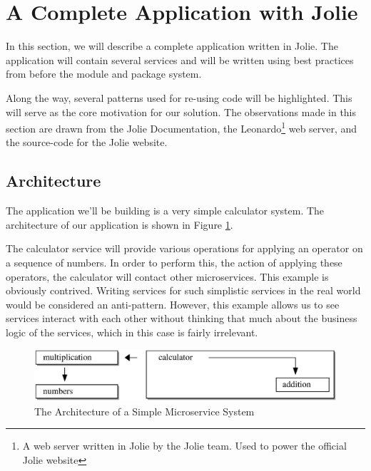\section{A Complete Application with Jolie}
\label{sec:complete}

In this section, we will describe a complete application written in Jolie. The
application will contain several services and will be written using best
practices from before the module and package system.

Along the way, several patterns used for re-using code will be highlighted.
This will serve as the core motivation for our solution. The observations made
in this section are drawn from the Jolie Documentation\autocite{JOLB}, the
Leonardo\footnote{A web server written in Jolie by the Jolie team. Used to
    power the official Jolie website} web server\autocite{LEO}, and the
    source-code for the Jolie website\autocite{LEOB}.

\subsection{Architecture}

%

The application we'll be building is a very simple calculator system. The
architecture of our application is shown in Figure \ref{fig:complete_arch}.

The calculator service will provide various operations for applying an operator
on a sequence of numbers. In order to perform this, the action of applying
these operators, the calculator will contact other microservices. This example
is obviously contrived. Writing services for such simplistic services in the
real world would be considered an anti-pattern. However, this example allows us
to see services interact with each other without thinking that much about the
business logic of the services, which in this case is fairly irrelevant.

\begin{figure}[H]
\centering
\includegraphics[width=1.0\textwidth]{background/calc_system.eps}
\caption{The Architecture of a Simple Microservice System}
\label{fig:complete_arch}
\end{figure}

